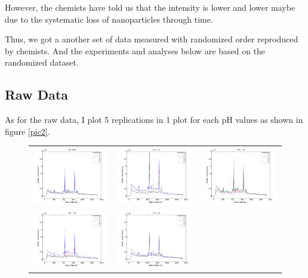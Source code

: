 \documentclass[a4paper]{article}
\begin{document}
However, the chemists have told us that the intensity is lower and lower maybe due to the systematic loss of nanoparticles through time.

Thus, we got a another set of data measured with randomized order reproduced by chemists. And the experiments and analyses below are based on the randomized dataset.
\subsection{Raw Data}
As for the raw data, I plot 5 replications in 1 plot for each pH values as shown in figure \ref{pic2}.
\begin{figure}[h]
\centering
\begin{tabular}{ccc}
\includegraphics[width=.33\textwidth]{images/1.pdf}  & 
\includegraphics[width=.33\textwidth]{images/2.pdf}  &
\includegraphics[width=.33\textwidth]{images/3.pdf}  \\ 
\includegraphics[width=.33\textwidth]{images/4.pdf}  &
\includegraphics[width=.33\textwidth]{images/5.pdf}  & 

\end{tabular}
\end{figure}
\end{document}
